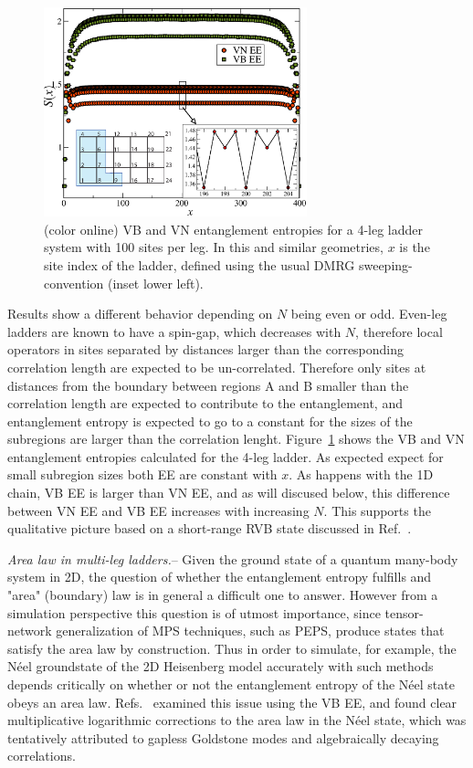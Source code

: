 \documentclass[prl,aps,twocolumn,floatfix,amsmath,amssymb,superscriptaddress,tightenlines]{revtex4}
\begin{document}
\begin{figure} { \includegraphics[width=3in]{FIG2.eps} \caption{(color
online) VB and VN entanglement entropies for a 4-leg
ladder system with 100 sites per leg.  In this and similar geometries, $x$
is the site index of the ladder, defined using the usual DMRG
sweeping-convention (inset lower left).  \label{ladder}}} \end{figure}

Results show a different behavior depending on $N$ being even or odd.
Even-leg ladders are known to have a spin-gap, which decreases with $N$,
therefore local operators in sites separated by distances larger than the
corresponding correlation length are expected to be un-correlated.
Therefore only sites at distances from the boundary between regions A and
B smaller than the correlation length are expected to contribute to the
entanglement, and entanglement entropy is expected to go to a constant for
the sizes of the subregions are larger than the correlation lenght.
Figure~\ref{ladder} shows the VB and VN entanglement entropies calculated
for the 4-leg ladder. As expected expect for small subregion sizes both EE
are constant with $x$. As happens with the 1D chain, VB EE is larger than
VN EE, and as will discused below, this difference between VN EE and VB EE
increases with increasing $N$. This supports the qualitative picture based
on a short-range RVB state discussed in Ref.~\cite{White??}.

{\it Area law in multi-leg ladders.}--  Given the ground state of a
quantum many-body system in 2D, the question of whether the entanglement
entropy fulfills and "area" (boundary) law is in general a difficult one
to answer.  However from a simulation perspective this question is of
utmost importance, since tensor-network generalization of MPS techniques,
such as PEPS, produce states that satisfy the area law by construction.
Thus in order to simulate, for example, the N\'eel groundstate of the 2D
Heisenberg model accurately with such methods depends critically on
whether or not the entanglement entropy of the N\'eel state obeys an area
law.  Refs.~\cite{Alet,Chh} examined this issue using the VB EE, and found
clear multiplicative logarithmic corrections to the area law in the N\'eel
state, which was tentatively attributed to gapless Goldstone modes and
algebraically decaying correlations.  
\end{document}
